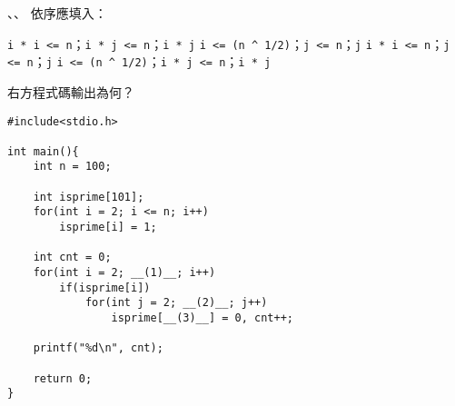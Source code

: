 \begin{multicols}{2}

\begin{enumerate}[start=16]

\begin{TestProblem}

、、 依序應填入：

\TestOptionOne
{\lstinline{i * i <= n}；\lstinline{i * j <= n}；\lstinline{i * j}}
{\lstinline{i <= (n ^ 1/2)}；\lstinline{j <= n}；\lstinline{j}}
{\lstinline{i * i <= n}；\lstinline{j <= n}；\lstinline{j}}
{\lstinline{i <= (n ^ 1/2)}；\lstinline{i * j <= n}；\lstinline{i * j}}

\end{TestProblem}

\begin{TestProblem}

右方程式碼輸出為何？


\end{TestProblem}

\end{enumerate}

\columnbreak

\begin{lstlisting}
#include<stdio.h>

int main(){
    int n = 100;
    
    int isprime[101];
    for(int i = 2; i <= n; i++)
        isprime[i] = 1;

    int cnt = 0;
    for(int i = 2; __(1)__; i++)
        if(isprime[i])
            for(int j = 2; __(2)__; j++)
                isprime[__(3)__] = 0, cnt++;

    printf("%d\n", cnt);

    return 0;
}
\end{lstlisting}

\end{multicols}
